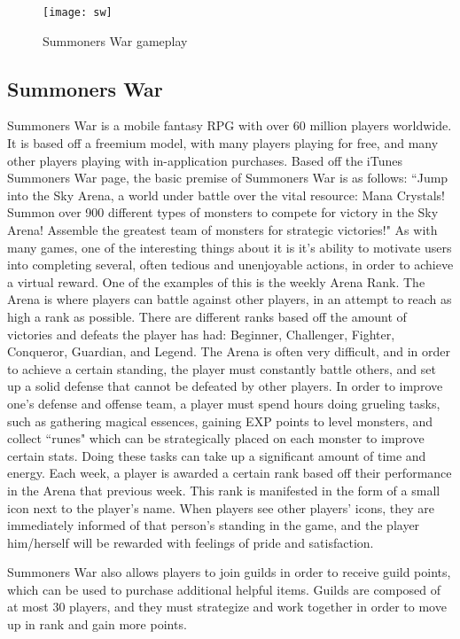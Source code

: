 \begin{figure}[h]
\centering
\texttt{[image: sw]}
\caption{Summoners War gameplay}
\end{figure}

\subsection{Summoners War}
Summoners War is a mobile fantasy RPG with over 60 million players worldwide. It is based off a freemium model, with many players playing for free, and many other players playing with in-application purchases. Based off the iTunes Summoners War page, the basic premise of Summoners War is as follows: ``Jump into the Sky Arena, a world under battle over the vital resource: Mana Crystals! Summon over 900 different types of monsters to compete for victory in the Sky Arena! Assemble the greatest team of monsters for strategic victories!" \cite{SummonersWar}
	As with many games, one of the interesting things about it is it's ability to motivate users into completing several, often tedious and unenjoyable actions, in order to achieve a virtual reward. One of the examples of this is the weekly Arena Rank. The Arena is where players can battle against other players, in an attempt to reach as high a rank as possible. There are different ranks based off the amount of victories and defeats the player has had: Beginner, Challenger, Fighter, Conqueror, Guardian, and Legend. The Arena is often very difficult, and in order to achieve a certain standing, the player must constantly battle others, and set up a solid defense that cannot be defeated by other players. In order to improve one's defense and offense team, a player must spend hours doing grueling tasks, such as gathering magical essences, gaining EXP points to level monsters, and collect ``runes" which can be strategically placed on each monster to improve certain stats. Doing these tasks can take up a significant amount of time and energy. Each week, a player is awarded a certain rank based off their performance in the Arena that previous week. This rank is manifested in the form of a small icon next to the player's name. When players see other players' icons, they are immediately informed of that person's standing in the game, and the player him/herself will be rewarded with feelings of pride and satisfaction.
	
Summoners War also allows players to join guilds in order to receive guild points, which can be used to purchase additional helpful items. Guilds are composed of at most 30 players, and they must strategize and work together in order to move up in rank and gain more points. 

